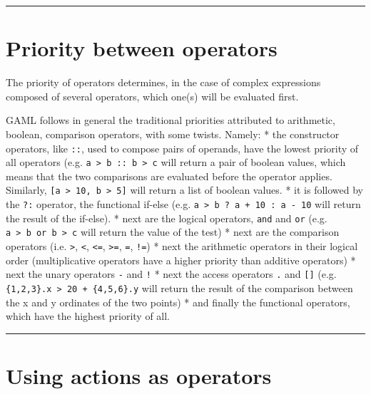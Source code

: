 \documentclass[]{book}
\theoremstyle{definition}
\theoremstyle{definition}
\theoremstyle{definition}
\theoremstyle{remark}
\begin{document}
\begin{center}\rule{0.5\linewidth}{\linethickness}\end{center}

\section{Priority between operators}\label{priority-between-operators}

The priority of operators determines, in the case of complex expressions
composed of several operators, which one(s) will be evaluated first.

GAML follows in general the traditional priorities attributed to
arithmetic, boolean, comparison operators, with some twists. Namely: *
the constructor operators, like \texttt{::}, used to compose pairs of
operands, have the lowest priority of all operators (e.g.
\texttt{a\ \textgreater{}\ b\ ::\ b\ \textgreater{}\ c} will return a
pair of boolean values, which means that the two comparisons are
evaluated before the operator applies. Similarly,
\texttt{{[}a\ \textgreater{}\ 10,\ b\ \textgreater{}\ 5{]}} will return
a list of boolean values. * it is followed by the \texttt{?:} operator,
the functional if-else (e.g.
\texttt{a\ \textgreater{}\ b\ ?\ a\ +\ 10\ :\ a\ -\ 10} will return the
result of the if-else). * next are the logical operators, \texttt{and}
and \texttt{or} (e.g.
\texttt{a\ \textgreater{}\ b\ or\ b\ \textgreater{}\ c} will return the
value of the test) * next are the comparison operators (i.e.
\texttt{\textgreater{}}, \texttt{\textless{}}, \texttt{\textless{}=},
\texttt{\textgreater{}=}, \texttt{=}, \texttt{!=}) * next the arithmetic
operators in their logical order (multiplicative operators have a higher
priority than additive operators) * next the unary operators \texttt{-}
and \texttt{!} * next the access operators \texttt{.} and
\texttt{{[}{]}} (e.g.
\texttt{\{1,2,3\}.x\ \textgreater{}\ 20\ +\ \{4,5,6\}.y} will return the
result of the comparison between the x and y ordinates of the two
points) * and finally the functional operators, which have the highest
priority of all.

\begin{center}\rule{0.5\linewidth}{\linethickness}\end{center}

\section{Using actions as operators}\label{using-actions-as-operators}
\end{document}
